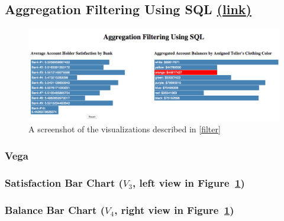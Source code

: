 \documentclass[fleqn]{sigplanconf}
\begin{document}
\subsection{Aggregation Filtering Using SQL \href{http://randy.cs.columbia.edu/lineage/pgbench-filter/pgbench.html}{(\underline{link})}}\label{filter}
\begin{figure}[H]
	\includegraphics[width=\columnwidth]{figures/filter}
	\caption{A screenshot of the visualizations described in \autoref{filter}
	}
	\label{fig_filter}
\end{figure}
\subsubsection{Vega}
\subsubsection*{Satisfaction Bar Chart ($V_3$, left view in Figure~\ref{fig_filter})}

\subsubsection*{Balance Bar Chart ($V_4$, right view in Figure~\ref{fig_filter})}

\end{document}
